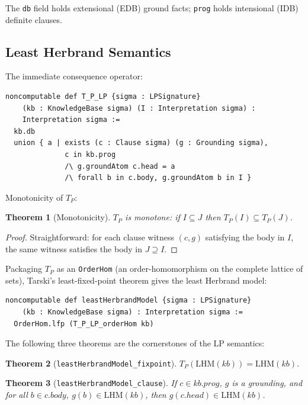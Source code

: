 \documentclass[]{article}
\newtheorem{theorem}{Theorem}
\newcommand{\code}[1]{\texttt{#1}}
\begin{document}
The \code{db} field holds extensional (EDB) ground facts; \code{prog} holds
intensional (IDB) definite clauses.

\subsection{Least Herbrand Semantics}

The immediate consequence operator:

\begin{lstlisting}[language=lean]
noncomputable def T_P_LP {sigma : LPSignature}
    (kb : KnowledgeBase sigma) (I : Interpretation sigma) :
    Interpretation sigma :=
  kb.db
  union { a | exists (c : Clause sigma) (g : Grounding sigma),
              c in kb.prog
              /\ g.groundAtom c.head = a
              /\ forall b in c.body, g.groundAtom b in I }
\end{lstlisting}

Monotonicity of $T_P$:

\begin{theorem}[Monotonicity]
$T_P$ is monotone: if $I \subseteq J$ then $T_P(I) \subseteq T_P(J)$.
\end{theorem}

\begin{proof}
Straightforward: for each clause witness $(c, g)$ satisfying the body in $I$,
the same witness satisfies the body in $J \supseteq I$.
\end{proof}

Packaging $T_P$ as an \code{OrderHom} (an order-homomorphism on the complete
lattice of sets), Tarski's least-fixed-point theorem gives the least Herbrand model:

\begin{lstlisting}[language=lean]
noncomputable def leastHerbrandModel {sigma : LPSignature}
    (kb : KnowledgeBase sigma) : Interpretation sigma :=
  OrderHom.lfp (T_P_LP_orderHom kb)
\end{lstlisting}

The following three theorems are the cornerstones of the LP semantics:

\begin{theorem}[\code{leastHerbrandModel\_fixpoint}]
\label{thm:lfp}
$T_P(\mathrm{LHM}(kb)) = \mathrm{LHM}(kb)$.
\end{theorem}

\begin{theorem}[\code{leastHerbrandModel\_clause}]
\label{thm:clause}
If $c \in kb.prog$, $g$ is a grounding, and for all $b \in c.body$,
$g(b) \in \mathrm{LHM}(kb)$, then $g(c.head) \in \mathrm{LHM}(kb)$.
\end{theorem}
\end{document}
